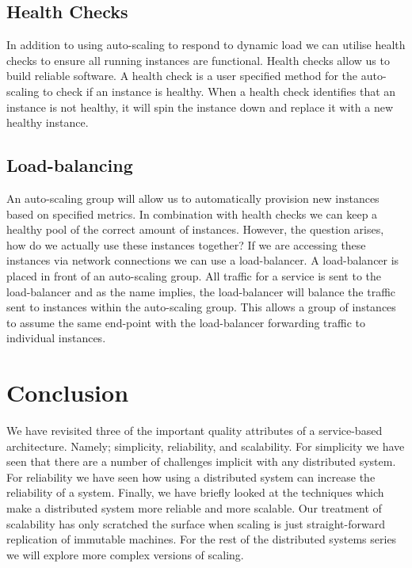 \subsection{Health Checks}

In addition to using auto-scaling to respond to dynamic load we can utilise health checks to ensure all running instances are functional.
Health checks allow us to build reliable software.
A health check is a user specified method for the auto-scaling to check if an instance is healthy.
When a health check identifies that an instance is not healthy, it will spin the instance down and replace it with a new healthy instance.

\subsection{Load-balancing}

An auto-scaling group will allow us to automatically provision new instances based on specified metrics.
In combination with health checks we can keep a healthy pool of the correct amount of instances.
However, the question arises, how do we actually use these instances together?
If we are accessing these instances via network connections we can use a load-balancer.
A load-balancer is placed in front of an auto-scaling group.
All traffic for a service is sent to the load-balancer and as the name implies,
the load-balancer will balance the traffic sent to instances within the auto-scaling group.
This allows a group of instances to assume the same end-point with the load-balancer forwarding traffic to individual instances.


\section{Conclusion}
We have revisited three of the important quality attributes of a service-based architecture.
Namely; simplicity, reliability, and scalability.
For simplicity we have seen that there are a number of challenges implicit with any distributed system.
For reliability we have seen how using a distributed system can increase the reliability of a system.
Finally, we have briefly looked at the techniques which make a distributed system more reliable and more scalable.
Our treatment of scalability has only scratched the surface when scaling is just straight-forward replication of immutable machines.
For the rest of the distributed systems series we will explore more complex versions of scaling.
